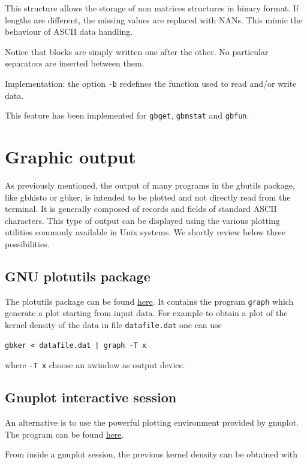 \documentclass[11pt]{article}
\begin{document}
This structure allows the storage of non matrices structures in binary
format. If lengths are different, the missing values are replaced with
NANs. This mimic the behaviour of ASCII data handling.

Notice that blocks are simply written one after the other. No
particular separators are inserted between them.

Implementation: the option \texttt{-b} redefines the function used to read
and/or write data.

This feature has been implemented for \texttt{gbget}, \texttt{gbmstat} and \texttt{gbfun}.
\section{Graphic output}
\label{sec-5}

As previously mentioned, the output of many programs in the gbutils
package, like gbhisto or gbker, is intended to be plotted and not
directly read from the terminal. It is generally composed of records
and fields of standard ASCII characters. This type of output can be
displayed using the various plotting utilities commonly available in
Unix systems. We shortly review below three possibilities.

\subsection{GNU plotutils package}
\label{sec-5-1}

The plotutils package can be found \href{http://www.gnu.org/software/plotutils/}{here}. It contains the program
\texttt{graph} which generate a plot starting from input data. For example to
obtain a plot of the kernel density of the data in file \texttt{datafile.dat}
one can use

\begin{verbatim}
gbker < datafile.dat | graph -T x
\end{verbatim}

where \verb~-T x~ choose an xwindow as output device.
\subsection{Gnuplot interactive session}
\label{sec-5-2}

An alternative is to use the powerful plotting environment provided by
gnuplot. The program can be found \href{http://www.gnuplot.info/}{here}.

From inside a gnuplot session, the previous kernel density can be
obtained with
\end{document}
